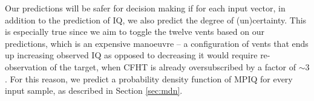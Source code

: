 
Our predictions will be safer for decision making if for each input vector, in addition to the prediction of IQ, we also predict the degree of (un)certainty. This is especially true since we aim to toggle the twelve vents based on our predictions, which is an expensive manoeuvre -- a configuration of vents that ends up increasing observed IQ as opposed to decreasing it would require re-observation of the target, when CFHT is already oversubscribed by a factor of $\sim 3$. For this reason, we predict a probability density function of MPIQ for every input sample, as described in Section \ref{sec:mdn}.


